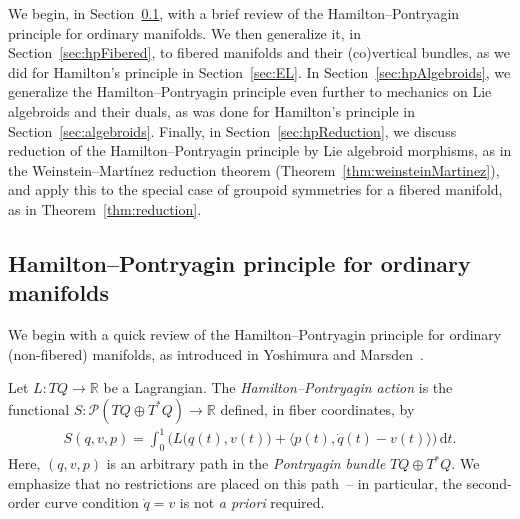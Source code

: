 \documentclass[pdftex]{sigma}
\numberwithin{equation}{section}
\begin{document}
We begin, in Section~\ref{sec:hpReview}, with a brief review of the Hamilton--Pontryagin principle for ordinary manifolds. We then generalize it, in Section~\ref{sec:hpFibered}, to f\/ibered manifolds and their (co)vertical bundles, as we did for Hamilton's principle in Section~\ref{sec:EL}. In Section~\ref{sec:hpAlgebroids}, we generalize the Hamilton--Pontryagin principle even further to mechanics on Lie algebroids and their duals, as was done for Hamilton's principle in Section~\ref{sec:algebroids}. Finally, in Section~\ref{sec:hpReduction}, we discuss reduction of the Hamilton--Pontryagin principle by Lie algebroid morphisms, as in the Weinstein--Mart\'inez reduction theorem (Theorem~\ref{thm:weinsteinMartinez}), and apply this to the special case of groupoid symmetries for a f\/ibered manifold, as in Theorem~\ref{thm:reduction}.

\subsection{Hamilton--Pontryagin principle for ordinary manifolds}\label{sec:hpReview}

We begin with a quick review of the Hamilton--Pontryagin principle for ordinary (non-f\/ibered) manifolds, as introduced in Yoshimura and Marsden~\cite{YoMa2006b}.

Let $ L \colon T Q \rightarrow \mathbb{R} $ be a Lagrangian. The \emph{Hamilton--Pontryagin action} is the functional $ S \colon \mathcal{P} ( T Q \oplus T ^\ast Q ) \rightarrow \mathbb{R} $ def\/ined, in f\/iber coordinates, by
\begin{gather*}
 S ( q, v , p ) = \int _0 ^1 \bigl( L \bigl( q (t) , v (t) \bigr) + \bigl\langle p (t) , \dot{q} (t) - v (t) \bigr\rangle \bigr) \,\mathrm{d}t .
\end{gather*}
Here, $ ( q, v, p ) $ is an arbitrary path in the \emph{Pontryagin bundle} $ T Q \oplus T ^\ast Q $. We emphasize that no restrictions are placed on this path~-- in particular, the second-order curve condition $ \dot{q} = v $ is not \emph{a priori} required.
\end{document}
